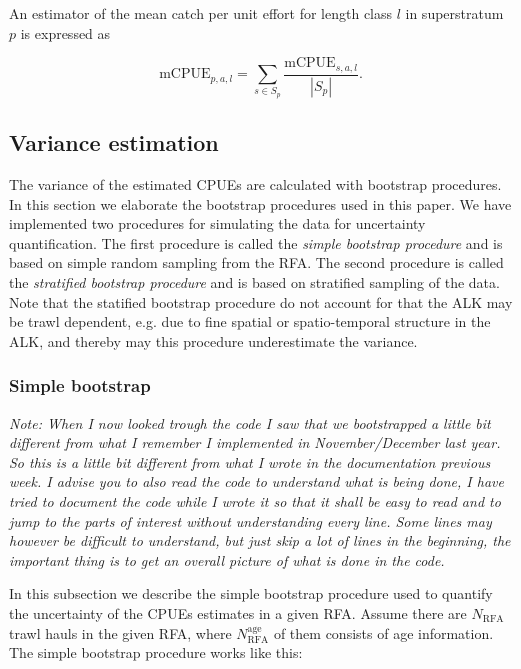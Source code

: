 \documentclass[a4paper 12pt]{article}
\numberwithin{equation}{section}
\begin{document}
An estimator of the mean catch per unit effort for length class $l$ in superstratum $p$ is expressed as


\begin{equation}
\mathrm{mCPUE}_{p,a,l} =  \sum\limits_{s \in S_{p}} \frac{\mathrm{mCPUE}_{s,a,l}}{|S_{p}|}.
\label{mcpueagerfa}
\end{equation}


\clearpage
\subsection{Variance estimation}
\label{bootall}
The variance of the estimated CPUEs are calculated with bootstrap procedures. In this section we elaborate the bootstrap procedures used in this paper. We have implemented two procedures for simulating the data for uncertainty quantification. The first procedure is called the \textit{simple bootstrap procedure} and is based on simple random sampling from the RFA. The second procedure is called the \textit{stratified bootstrap procedure} and is based on stratified sampling of the data. Note that the statified bootstrap procedure do not account for that the ALK may be trawl dependent, e.g. due to fine spatial or spatio-temporal structure in the ALK, and thereby may this procedure underestimate the variance.


\subsubsection{Simple bootstrap}
\label{simpleboot}
\textit{Note: When I now looked trough the code I saw that we bootstrapped a little bit different from what I remember I implemented in November/December last year. So this is a little bit different from what I wrote in the documentation previous week. I advise you to also read the code to understand what is being done, I have tried to document the code while I wrote it so that it shall be easy to read and to jump to the parts of interest without understanding every line. Some lines may however be difficult to understand, but just skip a lot of lines in the beginning, the important thing is to get an overall picture of what is done in the code.}

In this subsection we describe the simple bootstrap procedure used to quantify the uncertainty of the CPUEs estimates in a given RFA. Assume there are $N_{\text{RFA}}$ trawl hauls in the given RFA, where $N_{\text{RFA}}^{\text{age}}$ of them consists of age information. The simple bootstrap procedure works like this:
\end{document}
